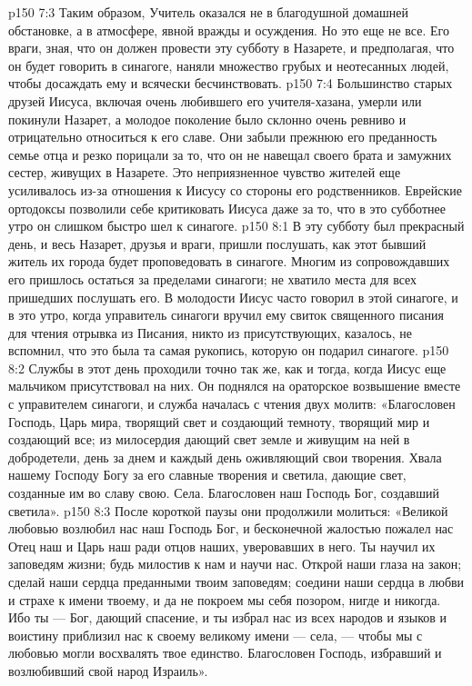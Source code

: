 \vs p150 7:3 Таким образом, Учитель оказался не в благодушной домашней обстановке, а в атмосфере, явной вражды и осуждения. Но это еще не все. Его враги, зная, что он должен провести эту субботу в Назарете, и предполагая, что он будет говорить в синагоге, наняли множество грубых и неотесанных людей, чтобы досаждать ему и всячески бесчинствовать.
\vs p150 7:4 Большинство старых друзей Иисуса, включая очень любившего его учителя\hyp{}хазана, умерли или покинули Назарет, а молодое поколение было склонно очень ревниво и отрицательно относиться к его славе. Они забыли прежнюю его преданность семье отца и резко порицали за то, что он не навещал своего брата и замужних сестер, живущих в Назарете. Это неприязненное чувство жителей еще усиливалось из\hyp{}за отношения к Иисусу со стороны его родственников. Еврейские ортодоксы позволили себе критиковать Иисуса даже за то, что в это субботнее утро он слишком быстро шел к синагоге.
\vs p150 8:1 В эту субботу был прекрасный день, и весь Назарет, друзья и враги, пришли послушать, как этот бывший житель их города будет проповедовать в синагоге. Многим из сопровождавших его пришлось остаться за пределами синагоги; не хватило места для всех пришедших послушать его. В молодости Иисус часто говорил в этой синагоге, и в это утро, когда управитель синагоги вручил ему свиток священного писания для чтения отрывка из Писания, никто из присутствующих, казалось, не вспомнил, что это была та самая рукопись, которую он подарил синагоге.
\vs p150 8:2 Службы в этот день проходили точно так же, как и тогда, когда Иисус еще мальчиком присутствовал на них. Он поднялся на ораторское возвышение вместе с управителем синагоги, и служба началась с чтения двух молитв: «Благословен Господь, Царь мира, творящий свет и создающий темноту, творящий мир и создающий все; из милосердия дающий свет земле и живущим на ней в добродетели, день за днем и каждый день оживляющий свои творения. Хвала нашему Господу Богу за его славные творения и светила, дающие свет, созданные им во славу свою. Села. Благословен наш Господь Бог, создавший светила».
\vs p150 8:3 После короткой паузы они продолжили молиться: «Великой любовью возлюбил нас наш Господь Бог, и бесконечной жалостью пожалел нас Отец наш и Царь наш ради отцов наших, уверовавших в него. Ты научил их заповедям жизни; будь милостив к нам и научи нас. Открой наши глаза на закон; сделай наши сердца преданными твоим заповедям; соедини наши сердца в любви и страхе к имени твоему, и да не покроем мы себя позором, нигде и никогда. Ибо ты --- Бог, дающий спасение, и ты избрал нас из всех народов и языков и воистину приблизил нас к своему великому имени --- села, --- чтобы мы с любовью могли восхвалять твое единство. Благословен Господь, избравший и возлюбивший свой народ Израиль».
